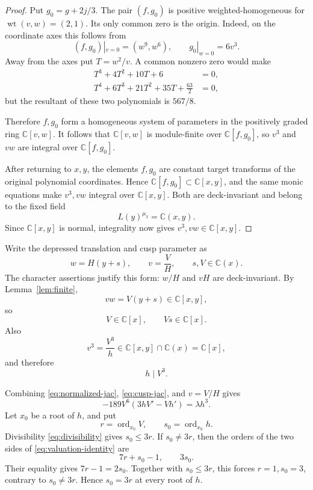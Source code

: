 \documentclass[11pt]{article}
\theoremstyle{definition}
\theoremstyle{remark}
\newcommand{\C}{\mathbb C}
\newcommand{\wt}{\operatorname{wt}}
\newcommand{\ord}{\operatorname{ord}}
\begin{document}
\begin{proof}
Put \(g_0=g+2j/3\).  The pair \((f,g_0)\) is positive
weighted-homogeneous for
\(\wt(v,w)=(2,1)\).  Its only common zero is the origin.
Indeed, on the coordinate axes this follows from
\[
 (f,g_0)|_{v=0}=(w^9,w^6),\qquad
 g_0|_{w=0}=6v^3.
\]
Away from the axes put \(T=w^2/v\).  A common nonzero zero would make
\[
\begin{aligned}
 T^3+4T^2+10T+6&=0,\\
 T^4+6T^3+21T^2+35T+\frac{63}{2}&=0,
\end{aligned}
\]
but the resultant of these two polynomials is \(567/8\).

Therefore \(f,g_0\) form a homogeneous system of parameters in the
positively graded ring \(\C[v,w]\).  It follows that
\(\C[v,w]\) is module-finite over \(\C[f,g_0]\), so \(v^3\) and \(vw\)
are integral over \(\C[f,g_0]\).

After returning to \(x,y\), the elements \(f,g_0\) are constant target
transforms of the original polynomial coordinates.  Hence
\(\C[f,g_0]\subset\C[x,y]\), and the same monic equations make
\(v^3,vw\) integral over \(\C[x,y]\).  Both are deck-invariant and
belong to the fixed field
\[
 L(y)^{\mu_3}=\C(x,y).
\]
Since \(\C[x,y]\) is normal, integrality now gives
\(v^3,vw\in\C[x,y]\).
\end{proof}

Write the depressed translation and cusp parameter as
\[
 w=H(y+s),\qquad v=\frac{V}{H},
 \qquad s,V\in\C(x).
\]
The character assertions justify this form: \(w/H\) and \(vH\) are
deck-invariant.  By Lemma~\ref{lem:finite},
\[
 vw=V(y+s)\in\C[x,y],
\]
so
\[
 V\in\C[x],\qquad Vs\in\C[x].
\]
Also
\[
 v^3=\frac{V^3}{h}\in\C[x,y]\cap\C(x)=\C[x],
\]
and therefore
\begin{equation}
 h\mid V^3.
\label{eq:divisibility}
\end{equation}

Combining \eqref{eq:normalized-jac},
\eqref{eq:cusp-jac}, and \(v=V/H\) gives
\begin{equation}
 \boxed{
 -189V^6(3hV'-Vh')=\lambda h^3.
 }
\label{eq:valuation-identity}
\end{equation}
Let \(x_0\) be a root of \(h\), and put
\[
 r=\ord_{x_0}V,\qquad s_0=\ord_{x_0}h.
\]
Divisibility \eqref{eq:divisibility} gives \(s_0\leq3r\).
If \(s_0\neq3r\), then the orders of the two sides of
\eqref{eq:valuation-identity} are
\[
 7r+s_0-1,\qquad 3s_0.
\]
Their equality gives \(7r-1=2s_0\).  Together with
\(s_0\leq3r\), this forces \(r=1,s_0=3\), contrary to
\(s_0\neq3r\).  Hence \(s_0=3r\) at every root of \(h\).
\end{document}
